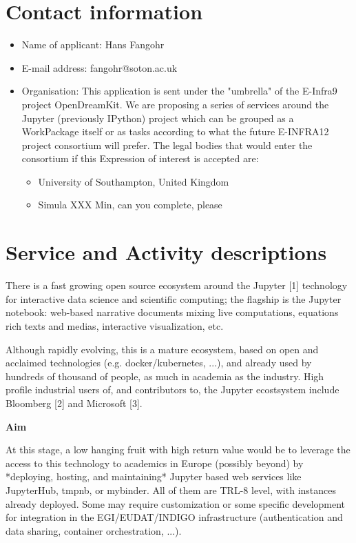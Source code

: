 \section{Contact information}
\begin{itemize}
\item Name of applicant: Hans Fangohr
\item E-mail address: fangohr@soton.ac.uk
  \item Organisation: This application is sent under the "umbrella" of the
E-Infra9 project OpenDreamKit. We are proposing a series of services
around the Jupyter (previously IPython) project which can be grouped
as a WorkPackage itself or as tasks according to what the future
E-INFRA12 project consortium will prefer. The legal bodies that would
enter the consortium if this Expression of interest is accepted are:
\begin{itemize}
\item University of Southampton, United Kingdom
\item Simula XXX Min, can you complete, please
\end{itemize}
\end{itemize}
\section{Service and Activity descriptions}

There is a fast growing open source ecosystem around the Jupyter [1]
technology for interactive data science and scientific computing; the
flagship is the Jupyter notebook: web-based narrative documents mixing
live computations, equations rich texts and medias, interactive
visualization, etc.

Although rapidly evolving, this is a mature ecosystem, based on open
and acclaimed technologies (e.g. docker/kubernetes, ...), and already
used by hundreds of thousand of people, as much in academia as the
industry. High profile industrial users of, and contributors to, the
Jupyter ecostsystem include Bloomberg [2] and Microsoft [3].

\textbf{Aim}

At this stage, a low hanging fruit with high return value would be to
leverage the access to this technology to academics in Europe
(possibly beyond) by *deploying, hosting, and maintaining* Jupyter
based web services like JupyterHub, tmpnb, or mybinder. All of them
are TRL-8 level, with instances already deployed. Some may require
customization or some specific development for integration in the
EGI/EUDAT/INDIGO infrastructure (authentication and data sharing,
container orchestration, ...).

